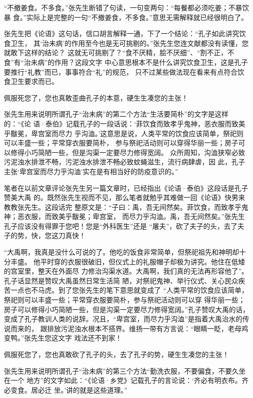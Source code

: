  “不撤姜食。不多食。”张先生断错了句读，一句变两句：“每餐都必须吃姜；不暴饮暴
食。”实际上是完整的一句“不撤姜食，不多食。”意思无需解释就已经很明白了。

张先生把《论语》这句话，信口胡言解释一通，下了一个结论：“孔子如此讲究饮食卫生，
其‘治未病’的作用至今也是无可挑剔的。”张先生您连文献都没有读懂，您就敢下这样的结论？
这就无可挑剔了？“食不厌精，脍不厌细”、“割不正，不食”有“治未病”的作用？这段文字
中心意思根本不是什么讲究饮食卫生，这是孔子要推行“礼教”而已，事事符合“礼”的规范，
只不过某些做法现在看来有点符合饮食卫生要求而已。

佩服死您了，您也真敢歪曲孔子的本意，硬生生凑您的主张！

张先生用来说明所谓孔子“治未病”的第二个方法“生活要简朴”的文字是这样的：“《论
语·泰伯》记载孔子的一段话说：‘菲饮食而致孝乎鬼神，恶衣服而致美乎黻冕，卑宫室而尽力
乎沟洫。’这意思是说，人类平常的饮食应该简单，祭祀则可以丰盛一些；平常穿衣服要简朴，
参与祭祀活动则可以穿得华丽一些；房子可以修得小巧简陋一些，但是沟渠一定要尽力修得宽阔。
众所周知，沟洫狭窄必致污泥浊水排泄不畅，污泥浊水排泄不畅必致蚊蝇滋生，流行病肆虐，因
此，孔子主张‘卑宫室而尽力乎沟洫’实在是有相当好的防疫意识的。” 

笔者在以前文章评论张先生另一篇文章时，已经指出《论语·泰伯》这段话是孔子赞美大禹
的。既然张先生视而不见，那么笔者就勉乎其难做一回《论语》快男来教教张先生。这段话完
整原文是：“子曰：禹，吾无间然矣。菲饮食，而致孝乎鬼神；恶衣服，而致美乎黻冕；卑宫室，
而尽力乎沟洫。禹，吾无间然矣。”张先生孔子应该没有得罪于您吧！您是“外科医生”还是
“屠夫”，砍了夫子的头，去了夫子的势，快，您这刀真快！

“大禹啊，我真是没什么可说的了。他吃的饭食非常简单，但祭祀祖先和神明却十分丰盛。
他平时穿的衣服很破旧，但仪式上的礼服帽子却极为讲究。他住在低矮的宫室里，整天在外面尽
力修治沟渠水道。大禹啊，我们真的无法再形容他了”。孔子话显然是赞叹大禹虽然日常生活简
陋，对祭祀鬼神、举行仪式、关心民众疾苦一点也不马虎。到了您张先生的笔下意思就变成了
“人类平常的饮食应该简单，祭祀则可以丰盛一些；平常穿衣服要简朴，参与祭祀活动则可以穿
得华丽一些；房子可以修得小巧简陋一些，但是沟渠一定要尽力修得宽阔。”孔子赞叹大禹的话，
变成了孔子教训人类的说辞。况且，“卑宫室，而尽力乎沟洫”是指着大禹治水的传说而来的，
跟排放污泥浊水根本不搭界。维扬一带有方言说：“眼睛一眨，老母鸡变鸭。”张先生您这文字
戏法还不到家！

佩服死您了，您也真敢砍了孔子的头，去了孔子的势，硬生生凑您的主张！

张先生用来说明所谓孔子“治未病”的第三个方法“勤洗衣服，不要偏食，不要久坐在一个
地方”的文字如此：“《论语·乡党》记载孔子的言论说：‘齐必有明衣布。齐必变食。居必迁
坐。’讲的就是这些道理。” 

